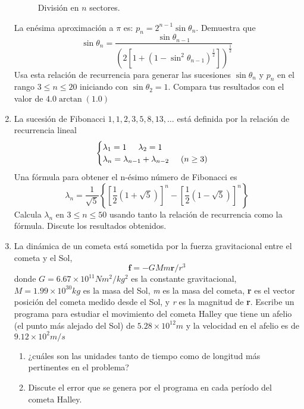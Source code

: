 \documentclass[12pt]{article}
\begin{document}
\begin{enumerate}
\begin{figure}[H]
\caption{Divisi\'{o}n en $n$ sectores.}
\end{figure}
La en\'{e}sima aproximaci\'{o}n a $\pi$ es: $p_{n}= 2^{n-1} \sin \theta_{n}$. Demuestra que
\[\sin \theta_{n} = \dfrac{\sin \theta_{n-1}}{\left( 2 \left[ 1+ (1-\sin^{2}\theta_{n-1})^{\frac{1}{2}} \right] \right)^{\frac{1}{2}}} \]
Usa esta relaci\'{o}n de recurrencia para generar las sucesiones $\sin \theta_{n}$ y $p_{n}$ en el rango $3 \leq n \leq 20$ iniciando con $\sin \theta_{2}=1$. Compara tus resultados con el valor de $4.0 \arctan(1.0)$
\item La sucesi\'{o}n de Fibonacci $1,1,2,3,5,8,13,\ldots$ est\'{a} definida por la relaci\'{o}n de recurrencia lineal
\begin{equation*}
\begin{cases}
\lambda_{1} = 1 \hspace{0.5cm} \lambda_{2}= 1 \\
\lambda_{n} = \lambda_{n-1} + \lambda_{n-2} \hspace{0.5cm} (n \geq 3)
\end{cases}
\end{equation*}
Una f\'{o}rmula para obtener el n-\'{e}simo n\'{u}mero de Fibonacci es
\[ \lambda_{n} = \dfrac{1}{\sqrt{5}} \left\lbrace \left[ \dfrac{1}{2} (1 + \sqrt{5}) \right]^{n} - \left[ \dfrac{1}{2} (1 - \sqrt{5}) \right]^{n} \right\rbrace \]
Calcula $\lambda_{n}$ en $3\leq n \leq 50$ usando tanto la relaci\'{o}n de recurrencia como la f\'{o}rmula. Discute los resultados obtenidos.
\item La din\'{a}mica de un cometa est\'{a} sometida por la fuerza gravitacional entre el cometa y el Sol, 
\[   \textbf{f} = -GMm \textbf{r}/r^{3} \]
donde $ G=6.67 \times 10^{11} Nm^{2}/kg^{2}$ es la constante gravitacional, $M=1.99 \times 10^{30} kg$ es la masa del Sol, \textit{m} es la masa del cometa, \textbf{r} es el vector posici\'{o}n del cometa medido desde el Sol, y \textit{r} es la magnitud de \textbf{r}. Escribe un programa para estudiar el movimiento del cometa Halley que tiene un afelio (el punto m\'{a}s alejado del Sol) de $5.28 \times 10^{12}m$ y la velocidad en el afelio es de $9.12 \times 10^{2} m/s$
\begin{enumerate}
\item ¿cu\'{a}les son las unidades tanto de tiempo como de longitud m\'{a}s pertinentes en el problema?
\item Discute el error que se genera por el programa en cada per\'{i}odo del cometa Halley.

\end{enumerate}
\end{enumerate}
\end{document}
